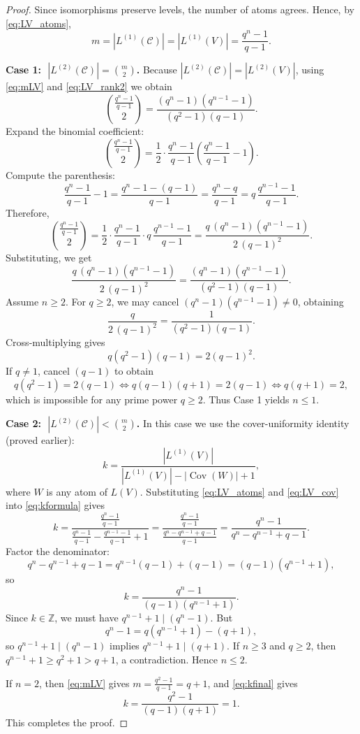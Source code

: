 \documentclass{article}
\begin{document}
\begin{proof}
Since isomorphisms preserve levels, the number of atoms agrees. Hence, by \eqref{eq:LV_atoms},
\begin{equation}\label{eq:mLV}
m=|L^{(1)}(\mathcal C)|=|L^{(1)}(V)|=\frac{q^n-1}{q-1}.
\end{equation}

\medskip
\noindent\textbf{Case 1: \(\;|L^{(2)}(\mathcal C)|=\binom{m}{2}\).}
Because \(|L^{(2)}(\mathcal C)|=|L^{(2)}(V)|\), using \eqref{eq:mLV} and \eqref{eq:LV_rank2} we obtain
\[
\binom{\frac{q^n-1}{q-1}}{2}
=
\frac{(q^n-1)(q^{n-1}-1)}{(q^2-1)(q-1)}.
\]
Expand the binomial coefficient:
\[
\binom{\frac{q^n-1}{q-1}}{2}
=\frac12\cdot\frac{q^n-1}{q-1}\left(\frac{q^n-1}{q-1}-1\right).
\]
Compute the parenthesis:
\[
\frac{q^n-1}{q-1}-1
=\frac{q^n-1-(q-1)}{q-1}
=\frac{q^n-q}{q-1}
= q\,\frac{q^{n-1}-1}{q-1}.
\]
Therefore,
\[
\binom{\frac{q^n-1}{q-1}}{2}
=\frac12\cdot\frac{q^n-1}{q-1}\cdot q\,\frac{q^{n-1}-1}{q-1}
=\frac{q\,(q^n-1)(q^{n-1}-1)}{2\,(q-1)^2}.
\]
Substituting, we get
\[
\frac{q\,(q^n-1)(q^{n-1}-1)}{2\,(q-1)^2}
=
\frac{(q^n-1)(q^{n-1}-1)}{(q^2-1)(q-1)}.
\]
Assume \(n\ge 2\).
For \(q\ge 2\), we may cancel \((q^n-1)(q^{n-1}-1)\neq 0\), obtaining
\[
\frac{q}{2\,(q-1)^2}=\frac{1}{(q^2-1)(q-1)}.
\]
Cross-multiplying gives
\[
q(q^2-1)(q-1)=2(q-1)^2.
\]
If \(q\neq 1\), cancel \((q-1)\) to obtain
\[
q(q^2-1)=2(q-1)
\iff q(q-1)(q+1)=2(q-1)
\iff q(q+1)=2,
\]
which is impossible for any prime power \(q\ge 2\).
Thus Case 1 yields $n\leq 1$.

\medskip
\noindent\textbf{Case 2: \(\;|L^{(2)}(\mathcal C)|<\binom{m}{2}\).}
In this case we use the cover-uniformity identity (proved earlier):
\begin{equation}\label{eq:kformula}
k=\frac{|L^{(1)}(V)|}{|L^{(1)}(V)|-|\operatorname{Cov}(W)|+1},
\end{equation}
where \(W\) is any atom of \(L(V)\).
Substituting \eqref{eq:LV_atoms} and \eqref{eq:LV_cov} into \eqref{eq:kformula} gives
\[
k
=\frac{\frac{q^n-1}{q-1}}
{\frac{q^n-1}{q-1}-\frac{q^{n-1}-1}{q-1}+1}
=\frac{\frac{q^n-1}{q-1}}
{\frac{q^n-q^{n-1}+q-1}{q-1}}
=\frac{q^n-1}{q^n-q^{n-1}+q-1}.
\]
Factor the denominator:
\[
q^n-q^{n-1}+q-1
=q^{n-1}(q-1)+(q-1)
=(q-1)(q^{n-1}+1),
\]
so
\begin{equation}\label{eq:kfinal}
k=\frac{q^n-1}{(q-1)(q^{n-1}+1)}.
\end{equation}
Since \(k\in\mathbb Z\), we must have \(q^{n-1}+1\mid(q^n-1)\).
But
\[
q^n-1=q(q^{n-1}+1)-(q+1),
\]
so \(q^{n-1}+1\mid(q^n-1)\) implies \(q^{n-1}+1\mid(q+1)\).
If \(n\ge 3\) and \(q\ge 2\), then \(q^{n-1}+1\ge q^2+1>q+1\), a contradiction.
Hence \(n\le 2\).

If \(n=2\), then \eqref{eq:mLV} gives \(m=\frac{q^2-1}{q-1}=q+1\), and \eqref{eq:kfinal} gives
\[
k=\frac{q^2-1}{(q-1)(q+1)}=1.
\]
This completes the proof.
\end{proof}
\end{document}
